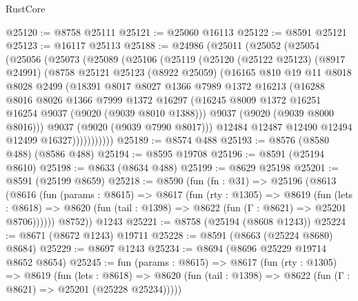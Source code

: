 \begin{lexlean}{RustCore}
\begin{coremodule}
@25120 := @8758 @25111
@25121 := @25060 @16113
@25122 := @8591 @25121
@25123 := @16117 @25113
@25188 := @24986
    (@25011
      (@25052
        (@25054
          (@25056
            (@25073
              (@25089
                (@25106
                  (@25119
                    (@25120
                      (@25122 @25123)
                      (@8917 @24991)
                      (@8758
                        @25121
                        @25123
                        (@8922 @25059)
                        (@16165
                          @810
                          @19
                          @11
                          @8018
                          @8028
                          @2499
                          (@18391
                            @8017
                            @8027
                            @1366
                            @7989
                            @1372
                            @16213
                            (@16288
                              @8016
                              @8026
                              @1366
                              @7999
                              @1372
                              @16297
                              (@16245 @8009 @1372 @16251 @16254 @9037 (@9020 (@9039 @8010 @1388)))
                              @9037
                              (@9020 (@9039 @8000 @8016)))
                            @9037
                            (@9020 (@9039 @7990 @8017)))
                          @12484
                          @12487
                          @12490
                          @12494
                          @12499
                          @16327)))))))))))
@25189 := @8574 @488
@25193 := @8576 (@8580 @488) (@8586 @488)
@25194 := @8595 @19708
@25196 := @8591 (@25194 @8610)
@25198 := @8633 (@8634 @488)
@25199 := @8629 @25198
@25201 := @8591 (@25199 @8659)
@25218 := @8590
    (fun (fn : @31) =>
    @25196
      (@8613
        (@8616
          (fun (params : @8615) =>
          @8617
            (fun (rty : @1305) =>
            @8619
              (fun (lets : @8618) =>
              @8620 (fun (tail : @1398) => @8622 (fun (Γ : @8621) => @25201 @8706))))))
        @8752))
    @1243
@25221 := @8758 (@25194 (@8608 @1243))
@25224 := @8671 (@8672 @1243) @19711
@25228 := @8591 (@8663 (@25224 @8680) @8684)
@25229 := @8697 @1243
@25234 := @8694 (@8696 @25229 @19714 @8652 @8654)
@25245 := fun (params : @8615) =>
  @8617
    (fun (rty : @1305) =>
    @8619
      (fun (lets : @8618) =>
      @8620 (fun (tail : @1398) => @8622 (fun (Γ : @8621) => @25201 (@25228 @25234)))))

\end{coremodule}
\end{lexlean}
